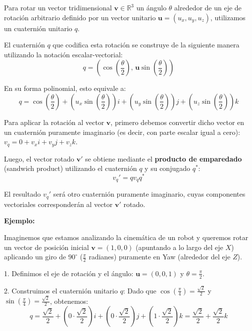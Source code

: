Para rotar un vector tridimensional $\mathbf{v} \in \mathbb{R}^3$ un ángulo $\theta$ alrededor de un eje de rotación arbitrario definido por un vector unitario $\mathbf{u} = (u_x, u_y, u_z)$, utilizamos un cuaternión unitario $q$. 

El cuaternión $q$ que codifica esta rotación se construye de la siguiente manera utilizando la notación escalar-vectorial:
\begin{equation}
    q = \left( \cos\left(\frac{\theta}{2}\right), \, \mathbf{u} \sin\left(\frac{\theta}{2}\right) \right)
\end{equation}

En su forma polinomial, esto equivale a:
\begin{equation}
    q = \cos\left(\frac{\theta}{2}\right) + \left( u_x \sin\left(\frac{\theta}{2}\right) \right)i + \left( u_y \sin\left(\frac{\theta}{2}\right) \right)j + \left( u_z \sin\left(\frac{\theta}{2}\right) \right)k
\end{equation}

Para aplicar la rotación al vector $\mathbf{v}$, primero debemos convertir dicho vector en un cuaternión puramente imaginario (es decir, con parte escalar igual a cero): $v_q = 0 + v_xi + v_yj + v_zk$. 

Luego, el vector rotado $\mathbf{v}'$ se obtiene mediante el \textbf{producto de emparedado} (sandwich product) utilizando el cuaternión $q$ y su conjugado $q^*$:
\begin{equation}
    v_q' = q v_q q^*
\end{equation}

El resultado $v_q'$ será otro cuaternión puramente imaginario, cuyas componentes vectoriales corresponderán al vector $\mathbf{v}'$ rotado.

\textbf{Ejemplo:}

Imaginemos que estamos analizando la cinemática de un robot y queremos rotar un vector de posición inicial $\mathbf{v} = (1, 0, 0)$ (apuntando a lo largo del eje $X$) aplicando un giro de $90^\circ$ ($\frac{\pi}{2}$ radianes) puramente en Yaw (alrededor del eje $Z$). 

1. Definimos el eje de rotación y el ángulo:
   $\mathbf{u} = (0, 0, 1)$ y $\theta = \frac{\pi}{2}$.

2. Construimos el cuaternión unitario $q$:
   Dado que $\cos(\frac{\pi}{4}) = \frac{\sqrt{2}}{2}$ y $\sin(\frac{\pi}{4}) = \frac{\sqrt{2}}{2}$, obtenemos:
   \begin{equation*}
       q = \frac{\sqrt{2}}{2} + \left(0 \cdot \frac{\sqrt{2}}{2}\right)i + \left(0 \cdot \frac{\sqrt{2}}{2}\right)j + \left(1 \cdot \frac{\sqrt{2}}{2}\right)k = \frac{\sqrt{2}}{2} + \frac{\sqrt{2}}{2}k
   \end{equation*}

